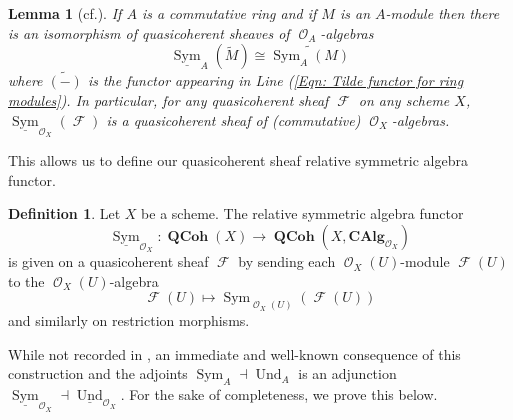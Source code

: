 \documentclass{amsart}
\newtheorem{lemma}[equation]{Lemma}
\theoremstyle{definition}
\newtheorem{definition}[equation]{Definition}
\DeclareMathOperator{\Fscr}{\mathscr{F}}
\DeclareMathOperator{\Ocal}{\mathcal{O}}
\DeclareMathOperator{\sym}{Sym}
\DeclareMathOperator{\und}{Und}
\newcommand{\CAlg}[1]{\mathbf{CAlg}_{#1}}
\newcommand{\Und}[1]{\und_{#1}}
\newcommand{\Sym}[1]{\sym_{#1}}
\newcommand{\RelSym}[1]{\underline{\sym}_{{#1}}}
\newcommand{\RelUnd}[1]{\underline{\und}_{{#1}}}
\DeclareMathOperator{\QCoh}{\mathbf{QCoh}}
\numberwithin{equation}{subsection}
\begin{document}
\begin{lemma}[{cf.\@ \cite[Proposition 1.7.6, Corollaire 1.7.7]{EGA2}}]
	If $A$ is a commutative ring and if $M$ is an $A$-module then there is an isomorphism of quasicoherent sheaves of $\Ocal_A$-algebras
	\[
	\RelSym{A}(\widetilde{M}) \cong \widetilde{\Sym{A}(M)}
	\]
	where $\widetilde{(-)}$ is the functor appearing in Line (\ref{Eqn: Tilde functor for ring modules}). In particular, for any quasicoherent sheaf $\Fscr$ on any scheme $X$, $\RelSym{\Ocal_X}(\Fscr)$ is a quasicoherent sheaf of (commutative) $\Ocal_X$-algebras.
\end{lemma}
This allows us to define our quasicoherent sheaf relative symmetric algebra functor.
\begin{definition}
	Let $X$ be a scheme. The relative symmetric algebra functor
	\[
	\RelSym{\Ocal_X}:\QCoh(X) \to \QCoh\left(X, \CAlg{\Ocal_X}\right)
	\]
	is given on a quasicoherent sheaf $\Fscr$ by sending each $\Ocal_X(U)$-module $\Fscr(U)$ to the $\Ocal_X(U)$-algebra
	\[
	\Fscr(U) \mapsto \Sym{\Ocal_X(U)}\left(\Fscr(U)\right)
	\]
	and similarly on restriction morphisms.
\end{definition}

While not recorded in \cite{EGA2}, an immediate and well-known consequence of this construction and the adjoints $\Sym{A} \dashv \Und{A}$ is an adjunction $\RelSym{\Ocal_X} \dashv \RelUnd{\Ocal_X}.$ For the sake of completeness, we prove this below.
\end{document}
